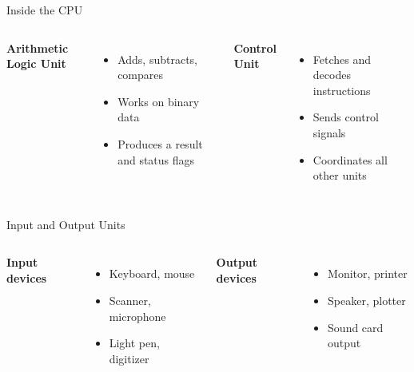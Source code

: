 \documentclass[aspectratio=169]{beamer}
\begin{document}
\begin{frame}{Inside the CPU}
  \begin{columns}[T]
      \textbf{Arithmetic Logic Unit}
      \begin{itemize}
        \item Adds, subtracts, compares
        \item Works on binary data
        \item Produces a result and status flags
      \end{itemize}
      \textbf{Control Unit}
      \begin{itemize}
        \item Fetches and decodes instructions
        \item Sends control signals
        \item Coordinates all other units
      \end{itemize}
  \end{columns}
  \vspace{0.3cm}
\end{frame}

\begin{frame}{Input and Output Units}
  \begin{columns}[T]
      \textbf{Input devices}
      \begin{itemize}
        \item Keyboard, mouse
        \item Scanner, microphone
        \item Light pen, digitizer
      \end{itemize}
      \textbf{Output devices}
      \begin{itemize}
        \item Monitor, printer
        \item Speaker, plotter
        \item Sound card output
      \end{itemize}
  \end{columns}
  \vspace{0.3cm}
\end{frame}
\end{document}
